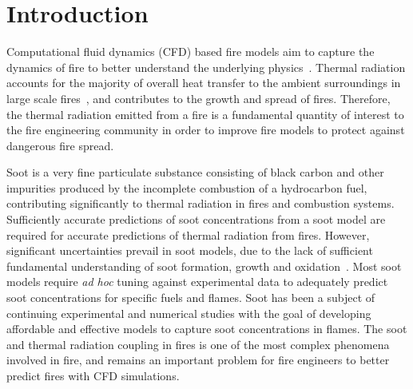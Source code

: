\documentclass[12pt]{CHT-20}
\author[*,\S]{Joseph N. Squeo}
\author[*]{Xinyu Zhao}
\affil[*]{Department of Mech. Eng., University of Connecticut, Storrs, CT 06269, United States}
\affil[ \S]{Correspondence author. Email: joseph.squeo@uconn.edu}
\begin{document}
\maketitle

\makeabstract
  
\section{Introduction}
Computational fluid dynamics (CFD) based fire models aim to capture the dynamics of fire to better understand the underlying physics~\citep[]{Roy}. Thermal radiation accounts for the majority of overall heat transfer to the ambient surroundings in large scale fires~\citep[]{DeRis1979}, and contributes to the growth and spread of fires. Therefore, the thermal radiation emitted from a fire is a fundamental quantity of interest to the fire engineering community in order to improve fire models to protect against dangerous fire spread. 

Soot is a very fine particulate substance consisting of black carbon and other impurities produced by the incomplete combustion of a hydrocarbon fuel, contributing significantly to thermal radiation in fires and combustion systems. Sufficiently accurate predictions of soot concentrations from a soot model are required for accurate predictions of thermal radiation from fires. However, significant uncertainties prevail in soot models, due to the lack of sufficient fundamental understanding of soot formation, growth and oxidation~\citep[]{Roy,modelAssessment}. Most soot models require {\em ad hoc} tuning against experimental data to adequately predict soot concentrations for specific fuels and flames. Soot has been a subject of continuing experimental and numerical studies with the goal of developing affordable and effective models to capture soot concentrations in flames. The soot and thermal radiation coupling in fires is one of the most complex phenomena involved in fire, and remains an important problem for fire engineers to better predict fires with CFD simulations.
\end{document}
